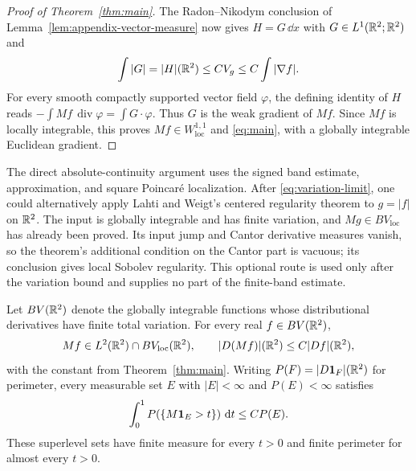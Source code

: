 \begin{proof}[Proof of Theorem~\ref{thm:main}]
The Radon--Nikodym conclusion of
Lemma~\ref{lem:appendix-vector-measure} now gives
$H=G\,\dd x$ with $G\in L^1(\mathbb R^2;\mathbb R^2)$ and
\[
 \int|G|=|H|(\mathbb R^2)\le CV_g\le C\int|\nabla f|.
\]
For every smooth compactly supported vector field $\varphi$,
the defining identity of $H$ reads
$-\int Mf\,\operatorname{div}\varphi=\int G\cdot\varphi$.
Thus $G$ is the weak gradient of $Mf$. Since $Mf$ is locally
integrable, this proves $Mf\in W^{1,1}_{\mathrm{loc}}$ and
\eqref{eq:main}, with a globally integrable Euclidean gradient.
\end{proof}

\begin{remark}
The direct absolute-continuity argument uses the signed band
estimate, approximation, and square Poincar\'e localization.
After \eqref{eq:variation-limit}, one could alternatively apply
Lahti and Weigt's centered regularity theorem
\cite[Theorem~1.2]{LahtiWeigt2025} to $g=|f|$ on $\mathbb R^2$.
The input is globally integrable and has finite variation, and
$Mg\in BV_{\mathrm{loc}}$ has already been proved. Its input
jump and Cantor derivative measures vanish, so the theorem's
additional condition on the Cantor part is vacuous; its conclusion
gives local Sobolev regularity. This optional route is used only
after the variation bound and supplies no part of the finite-band
estimate.
\end{remark}

\begin{corollary}\label{cor:bv-input}
Let $BV(\mathbb R^2)$ denote the globally integrable functions whose
distributional derivatives have finite total variation. For every
real $f\in BV(\mathbb R^2)$,
\[
 Mf\in L^2(\mathbb R^2)\cap BV_{\mathrm{loc}}(\mathbb R^2),
 \qquad |D(Mf)|(\mathbb R^2)\le C|Df|(\mathbb R^2),
\]
with the constant from Theorem~\ref{thm:main}.
Writing $P(F)=|D\mathbf 1_F|(\mathbb R^2)$ for perimeter, every measurable
set $E$ with $|E|<\infty$ and $P(E)<\infty$ satisfies
\[
 \int_0^1 P(\{M\mathbf 1_E>t\})\,\mathop{}\!\mathrm{d} t\le CP(E).
\]
These superlevel sets have finite measure for every $t>0$ and
finite perimeter for almost every $t>0$.
\end{corollary}

